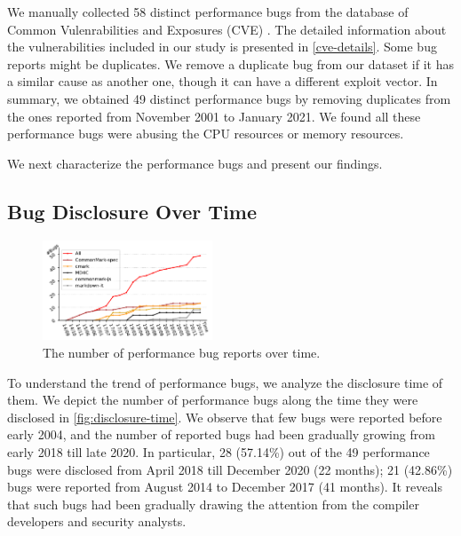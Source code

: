 We manually collected 58 distinct performance bugs from the database of Common Vulenrabilities and Exposures (CVE) \cite{cve}.
%
The detailed information about the vulnerabilities included in our study is presented in \autoref{cve-details}.
%
Some bug reports might be duplicates.
%
We remove a duplicate bug from our dataset if it has a similar cause as another one,
%
though it can have a different exploit vector.
%
In summary, we obtained 49 distinct performance bugs by removing \XXX duplicates from the ones reported from November 2001 to January 2021.
%
We found all these performance bugs were abusing the CPU resources or memory resources.
%

We next characterize the performance bugs and present our findings.

\subsection{Bug Disclosure Over Time}
\label{s:study-time}

\begin{figure}[t]
    \centering
    \includegraphics[width=0.45\textwidth, trim =5 0 0 0,clip]{fig/disclosure-time.pdf}
    \caption{The number of performance bug reports over time.
    }
    \label{fig:disclosure-time}
\end{figure}

To understand the trend of performance bugs, we analyze the disclosure time of them.  
We depict the number of performance bugs along the time they were disclosed in \autoref{fig:disclosure-time}.
%
We observe that few bugs were reported before early 2004, and the number of reported bugs had been gradually growing from early 2018 till late 2020.
%
In particular, 28 (57.14\%) out of the 49 performance bugs were disclosed from April 2018 till December 2020 (22 months);
%
21 (42.86\%) bugs were reported from August 2014 to December 2017 (41 months).
%
It reveals that such bugs had been gradually drawing the attention from the compiler developers and security analysts.
%

